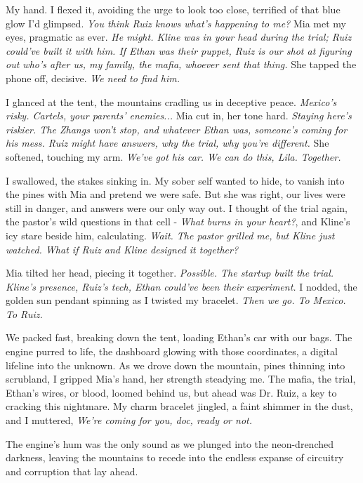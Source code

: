 \documentclass[12pt,oneside]{book} %
\begin{document}
My hand. I flexed it, avoiding the urge to look too close, terrified of that blue glow I’d glimpsed. \textit{You think Ruiz knows what’s happening to me?} Mia met my eyes, pragmatic as ever. \textit{He might. Kline was in your head during the trial; Ruiz could’ve built it with him. If Ethan was their puppet, Ruiz is our shot at figuring out who’s after us, my family, the mafia, whoever sent that thing.} She tapped the phone off, decisive. \textit{We need to find him.}

I glanced at the tent, the mountains cradling us in deceptive peace. \textit{Mexico’s risky. Cartels, your parents’ enemies...} Mia cut in, her tone hard. \textit{Staying here’s riskier. The Zhangs won’t stop, and whatever Ethan was, someone’s coming for his mess. Ruiz might have answers, why the trial, why you’re different.} She softened, touching my arm. \textit{We’ve got his car. We can do this, Lila. Together.}

I swallowed, the stakes sinking in. My sober self wanted to hide, to vanish into the pines with Mia and pretend we were safe. But she was right, our lives were still in danger, and answers were our only way out. I thought of the trial again, the pastor’s wild questions in that cell - \textit{What burns in your heart?}, and Kline’s icy stare beside him, calculating. \textit{Wait. The pastor grilled me, but Kline just watched. What if Ruiz and Kline designed it together?}

Mia tilted her head, piecing it together. \textit{Possible. The startup built the trial. Kline’s presence, Ruiz’s tech, Ethan could’ve been their experiment.} I nodded, the golden sun pendant spinning as I twisted my bracelet. \textit{Then we go. To Mexico. To Ruiz.}

We packed fast, breaking down the tent, loading Ethan’s car with our bags. The engine purred to life, the dashboard glowing with those coordinates, a digital lifeline into the unknown. As we drove down the mountain, pines thinning into scrubland, I gripped Mia’s hand, her strength steadying me. The mafia, the trial, Ethan’s wires, or blood, loomed behind us, but ahead was Dr. Ruiz, a key to cracking this nightmare. My charm bracelet jingled, a faint shimmer in the dust, and I muttered, \textit{We’re coming for you, doc, ready or not.}

The engine's hum was the only sound as we plunged into the neon-drenched darkness, leaving the mountains to recede into the endless expanse of circuitry and corruption that lay ahead.
\end{document}
